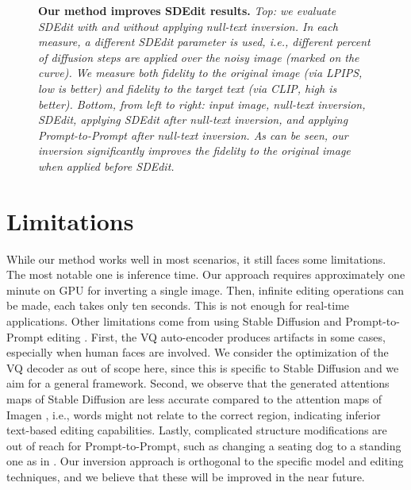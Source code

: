 \begin{figure}
{\begin{tabular}
\end{tabular}
}


\vspace{-0.25cm}
\caption{{\bf Our method improves SDEdit results.} {\it 
Top: we evaluate SDEdit with and without applying null-text inversion. 
In each measure, a different SDEdit parameter is used, i.e., different percent of diffusion steps are applied over the noisy image (marked on the curve). 
We measure both fidelity to the original image (via LPIPS, low is better) and fidelity to the target text (via CLIP, high is better).
Bottom, from left to right: input image, null-text inversion, SDEdit, applying SDEdit after null-text inversion, and applying Prompt-to-Prompt after null-text inversion. 
As can be seen, our inversion significantly improves the fidelity to the original image when applied before SDEdit. }}
\vspace{-0.4cm}
\label{fig:sdedit_null} \end{figure}





 

\section{Limitations}


While our method works well in most scenarios, it still faces some limitations. The most notable one is inference time. Our approach requires approximately one minute on GPU for inverting a single image. Then, infinite editing operations can be made, each takes only ten seconds. This is not enough for real-time applications.
Other limitations come from using Stable Diffusion \cite{rombach2021highresolution} and Prompt-to-Prompt editing \cite{hertz2022prompt}. First, the VQ auto-encoder produces artifacts in some cases, especially when human faces are involved. We consider the optimization of the VQ decoder as out of scope here, since this is specific to Stable Diffusion and we aim for a general framework. Second, we observe that the generated attentions maps of Stable Diffusion are less accurate compared to the attention maps of Imagen \cite{saharia2022photorealistic}, i.e., words might not relate to the correct region, indicating inferior text-based editing capabilities. 
Lastly, complicated structure modifications are out of reach for Prompt-to-Prompt, such as changing a seating dog to a standing one as in \cite{Kawar2022ImagicTR}.
Our inversion approach is orthogonal to the specific model and editing techniques, and we believe that these will be improved in the near future.











